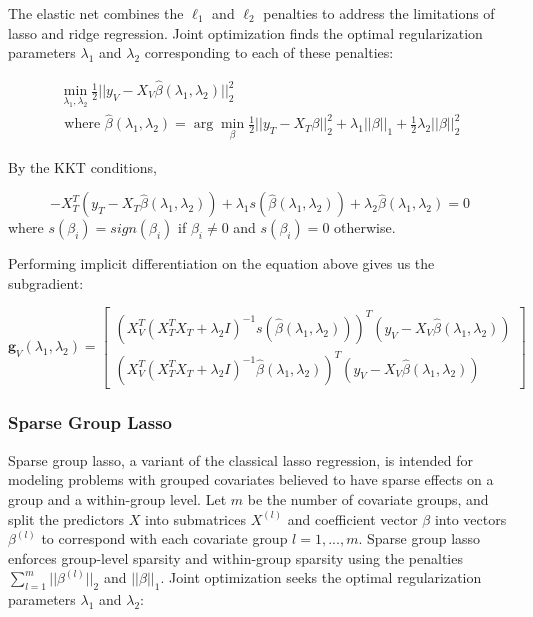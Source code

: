 \documentclass[10pt,letterpaper]{article}
\begin{document}
The elastic net combines the $\ell_1$ and $\ell_2$ penalties to address the limitations of lasso and ridge regression. Joint optimization finds the optimal regularization parameters $\lambda_1$ and $\lambda_2$ corresponding to each of these penalties:

\begin{equation}
\begin{array}{c}
\min_{\lambda_1, \lambda_2} \frac{1}{2} \bigl\lvert\bigl\lvert y_V - X_V \hat \beta (\lambda_1, \lambda_2) \bigl\rvert\bigl\rvert^2_2 \\
\text{ where }
\hat \beta (\lambda_1, \lambda_2) = \arg\min_{\beta} \frac{1}{2} \bigl\lvert\bigl\lvert y_T - X_T\beta \bigl\rvert\bigl\rvert^2_2
+ \lambda_1 \lvert\lvert \beta \rvert \rvert_1
+ \frac{1}{2}\lambda_2 \lvert\lvert \beta \rvert \rvert_2^2
\end{array}
\end{equation}

By the KKT conditions,

\begin{equation}
-X_T^T(y_T - X_T \hat \beta (\lambda_1, \lambda_2) ) + \lambda_1 s(\hat \beta (\lambda_1, \lambda_2)) + \lambda_2 \hat \beta (\lambda_1, \lambda_2) = 0
\end{equation}
where $s(\beta_i) = sign(\beta_i)$ if $\beta_i \ne 0$ and $s(\beta_i) = 0$ otherwise.

Performing implicit differentiation on the equation above gives us the subgradient:

\begin{equation}
\boldsymbol{g}_V(\lambda_1, \lambda_2) =
\begin{bmatrix}
(X_V^T(X_T^T X_T + \lambda_2 I)^{-1} s(\hat \beta (\lambda_1, \lambda_2)))^T(y_V - X_V \hat\beta (\lambda_1, \lambda_2))\\
(X_V^T(X_T^T X_T + \lambda_2 I)^{-1} \hat \beta (\lambda_1, \lambda_2))^T(y_V - X_V \hat\beta (\lambda_1, \lambda_2))
\end{bmatrix}
\end{equation}


\subsubsection{Sparse Group Lasso}

Sparse group lasso, a variant of the classical lasso regression, is intended for modeling problems with grouped covariates believed to have sparse effects on a group and a within-group level. Let $m$ be the number of covariate groups, and split the predictors $X$ into submatrices $X^{(l)}$ and coefficient vector $\beta$ into vectors $\beta^{(l)}$ to correspond with each covariate group $l = 1, ... , m$. Sparse group lasso enforces group-level sparsity and within-group sparsity using the penalties $\sum_{l=1}^m \lvert\lvert \beta^{(l)} \rvert \rvert_2$ and $||\beta ||_1$. Joint optimization seeks the optimal regularization parameters $\lambda_1$ and $\lambda_2$:
\end{document}
